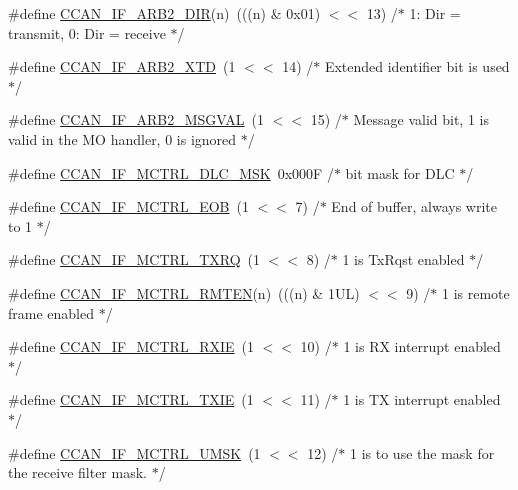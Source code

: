 \begin{DoxyCompactItemize}
\item 
\#define \hyperlink{group___c_c_a_n__18_x_x__43_x_x_ga0bc000e496f46b34316ba9271c177fcc}{C\+C\+A\+N\+\_\+\+I\+F\+\_\+\+A\+R\+B2\+\_\+\+D\+IR}(n)~(((n) \& 0x01) $<$$<$ 13)	/$\ast$ 1\+: Dir = transmit, 0\+: Dir = receive $\ast$/
\item 
\#define \hyperlink{group___c_c_a_n__18_x_x__43_x_x_ga5da2db0d7aa00bea000fe1fb0be9c3ff}{C\+C\+A\+N\+\_\+\+I\+F\+\_\+\+A\+R\+B2\+\_\+\+X\+TD}~(1 $<$$<$ 14)		/$\ast$ Extended identifier bit is used$\ast$/
\item 
\#define \hyperlink{group___c_c_a_n__18_x_x__43_x_x_ga11ed203f0f2890790f98a3a03f411755}{C\+C\+A\+N\+\_\+\+I\+F\+\_\+\+A\+R\+B2\+\_\+\+M\+S\+G\+V\+AL}~(1 $<$$<$ 15)		/$\ast$ Message valid bit, 1 is valid in the MO handler, 0 is ignored $\ast$/
\item 
\#define \hyperlink{group___c_c_a_n__18_x_x__43_x_x_ga8f4338ea37e765187c00106b7491482b}{C\+C\+A\+N\+\_\+\+I\+F\+\_\+\+M\+C\+T\+R\+L\+\_\+\+D\+L\+C\+\_\+\+M\+SK}~0x000\+F			/$\ast$ bit mask for D\+L\+C $\ast$/
\item 
\#define \hyperlink{group___c_c_a_n__18_x_x__43_x_x_ga31daef8dcd1bbf0747588f87d62f84e0}{C\+C\+A\+N\+\_\+\+I\+F\+\_\+\+M\+C\+T\+R\+L\+\_\+\+E\+OB}~(1 $<$$<$ 7)		/$\ast$ End of buffer, always write to 1 $\ast$/
\item 
\#define \hyperlink{group___c_c_a_n__18_x_x__43_x_x_ga46f7cf2fc1d4b31ca113aa5de5c178b2}{C\+C\+A\+N\+\_\+\+I\+F\+\_\+\+M\+C\+T\+R\+L\+\_\+\+T\+X\+RQ}~(1 $<$$<$ 8)		/$\ast$ 1 is Tx\+Rqst enabled $\ast$/
\item 
\#define \hyperlink{group___c_c_a_n__18_x_x__43_x_x_gaf83e3b00cb47a292c183aae1248d7a8d}{C\+C\+A\+N\+\_\+\+I\+F\+\_\+\+M\+C\+T\+R\+L\+\_\+\+R\+M\+T\+EN}(n)~(((n) \& 1\+U\+L) $<$$<$ 9)	/$\ast$ 1 is remote frame enabled $\ast$/
\item 
\#define \hyperlink{group___c_c_a_n__18_x_x__43_x_x_ga1412ab53713b6ac3d16c1422b40df96b}{C\+C\+A\+N\+\_\+\+I\+F\+\_\+\+M\+C\+T\+R\+L\+\_\+\+R\+X\+IE}~(1 $<$$<$ 10)		/$\ast$ 1 is RX interrupt enabled $\ast$/
\item 
\#define \hyperlink{group___c_c_a_n__18_x_x__43_x_x_gabde8e5b20439ed42cefecf0f42d79795}{C\+C\+A\+N\+\_\+\+I\+F\+\_\+\+M\+C\+T\+R\+L\+\_\+\+T\+X\+IE}~(1 $<$$<$ 11)		/$\ast$ 1 is TX interrupt enabled $\ast$/
\item 
\#define \hyperlink{group___c_c_a_n__18_x_x__43_x_x_ga9d4b7ef7ab984451466e90942380cb7c}{C\+C\+A\+N\+\_\+\+I\+F\+\_\+\+M\+C\+T\+R\+L\+\_\+\+U\+M\+SK}~(1 $<$$<$ 12)		/$\ast$ 1 is to use the mask for the receive filter mask. $\ast$/
$$
\end{DoxyCompactItemize}
